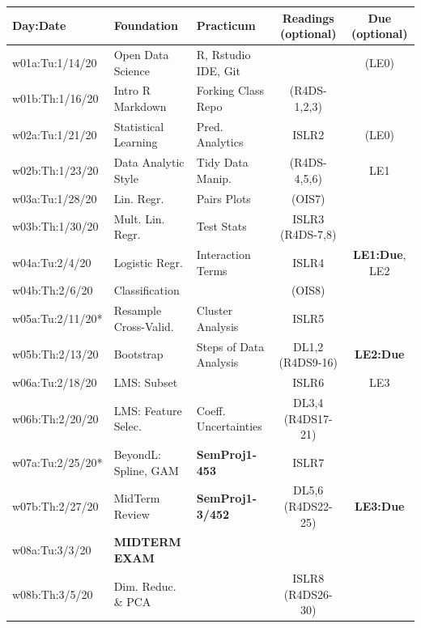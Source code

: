\documentclass[11pt]{article} %
\begin{document}
  \begin{table}[h] 
  	\centering %
  	\begin{tabular}{| l | p{4cm} | p{4cm} | c | c |} %
  	\hline %
  	Day:Date & Foundation & Practicum  & Readings (optional) & Due (optional)  \\ %
  	\hline 
  	\hline %
    w01a:Tu:1/14/20 & Open Data Science & R, Rstudio IDE, Git &  & (LE0) \\ %
    \hline %
    w01b:Th:1/16/20 & Intro R Markdown & Forking Class Repo & (R4DS-1,2,3) & \\ 
    \hline  
    \hline
     w02a:Tu:1/21/20 & Statistical Learning & Pred. Analytics & ISLR2 & (LE0) \\ 
    \hline
    w02b:Th:1/23/20 &  Data Analytic Style & Tidy Data Manip. & (R4DS-4,5,6) & LE1 \\
    \hline 
    \hline
    w03a:Tu:1/28/20 & Lin. Regr. & Pairs Plots & (OIS7) &  \\ 
    \hline
    w03b:Th:1/30/20 & Mult. Lin. Regr. & Test Stats & ISLR3 (R4DS-7,8) & \\
    \hline
    \hline 
    w04a:Tu:2/4/20 & Logistic Regr. & Interaction Terms & ISLR4 & {\bf LE1:Due}, LE2\\ 
    \hline
    w04b:Th:2/6/20 & Classification & & (OIS8) & \\
    \hline
    \hline 
    w05a:Tu:2/11/20* & Resample Cross-Valid. & Cluster Analysis & ISLR5 &  \\ 
    \hline
    w05b:Th:2/13/20 & Bootstrap & Steps of Data Analysis & DL1,2 (R4DS9-16) & {\bf LE2:Due} \\
    \hline
    \hline 
    w06a:Tu:2/18/20 & LMS: Subset &  & ISLR6 & LE3 \\ 
    \hline
    w06b:Th:2/20/20 & LMS: Feature Selec. & Coeff. Uncertainties & DL3,4 (R4DS17-21) &  \\
    \hline
    \hline 
    w07a:Tu:2/25/20* & BeyondL: Spline, GAM & {\bf SemProj1-453} & ISLR7 &  \\ 
    \hline
    w07b:Th:2/27/20 & MidTerm Review & {\bf SemProj1-3/452} & DL5,6 (R4DS22-25) & {\bf LE3:Due} \\
    \hline
    \hline 
    w08a:Tu:3/3/20 & {\bf MIDTERM EXAM} &  &  &  \\ 
    \hline
    w08b:Th:3/5/20 & Dim. Reduc. \& PCA &  & ISLR8 (R4DS26-30) & \\

\end{tabular}
\end{table}
\end{document}
